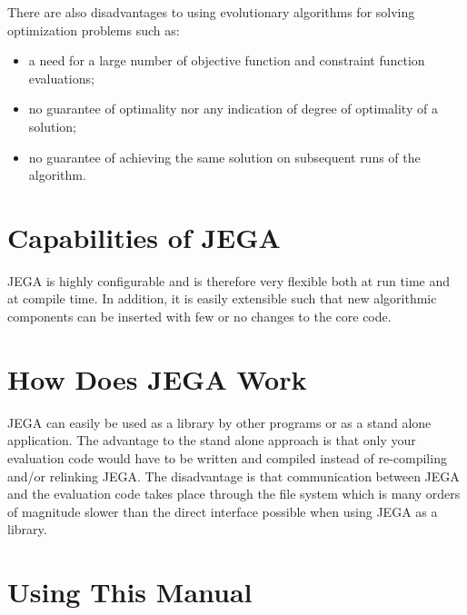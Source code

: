 There are also disadvantages to using evolutionary algorithms for
solving optimization problems such as:

\begin{itemize}

\item a need for a large number of objective function and constraint function evaluations;
\item no guarantee of optimality nor any indication of degree of optimality of a solution;
\item no guarantee of achieving the same solution on subsequent runs of the algorithm.

\end{itemize}



\section{Capabilities of JEGA} \label{sec:JEGA_capabilities}

JEGA is highly configurable and is therefore very flexible both at
run time and at compile time. In addition, it is easily extensible
such that new algorithmic components can be inserted with few or no
changes to the core code.

\section{How Does JEGA Work} \label{sec:JEGA_how_it_works}

JEGA can easily be used as a library by other programs or as a stand
alone application.  The advantage to the stand alone approach is
that only your evaluation code would have to be written and compiled
instead of re-compiling and/or relinking JEGA.  The disadvantage is
that communication between JEGA and the evaluation code takes place
through the file system which is many orders of magnitude slower
than the direct interface possible when using JEGA as a library.

\section{Using This Manual} \label{sec:JEGA_using_manual}
